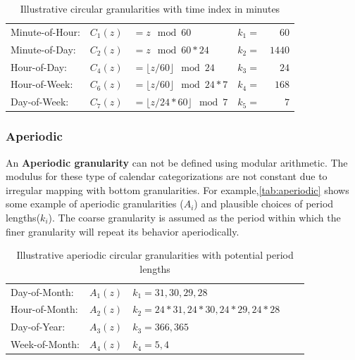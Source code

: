 \documentclass[12pt]{article}
\begin{document}
\begin{table}[ht]
\begin{center}
\begin{tabular}{lr@{~}lr@{~}r}
\toprule
Minute-of-Hour: & $C_1(z)$ & $= z \mod 60$ & $k_1 =$&$60$ \\
Minute-of-Day: & $C_2(z)$ & $= z \mod 60*24$ & $k_2=$&$1440$\\
Hour-of-Day: & $C_4(z)$ & $= \lfloor z/60\rfloor\mod 24$  & $k_3 =$&$24$ \\
Hour-of-Week: & $C_6(z)$ & $= \lfloor z/60\rfloor\mod 24*7$  & $k_4=$&$168$\\
Day-of-Week: & $C_7(z)$ & $= \lfloor z/24*60\rfloor \mod 7$ & $k_5=$&$7$\\
\bottomrule
\end{tabular}
\end{center}
\caption{Illustrative circular granularities with time index in minutes}
\label{tab:definitions}
\end{table}

\hypertarget{sec:aperiodic-gran-def}{%
\subsubsection{Aperiodic}\label{sec:aperiodic-gran-def}}

An \textbf{Aperiodic granularity} can not be defined using modular
arithmetic. The modulus for these type of calendar categorizations are
not constant due to irregular mapping with bottom granularities. For
example,\autoref{tab:aperiodic} shows some example of aperiodic
granularities (\(A_i\)) and plausible choices of period
lengths(\(k_i\)). The coarse granularity is assumed as the period within
which the finer granularity will repeat its behavior aperiodically.

\begin{table}[ht]
\begin{center}
\begin{tabular}{lr@{~}lr@{~}r}
\toprule

Day-of-Month: & $A_1(z)$ &  $k_1=31, 30, 29, 28$\\
Hour-of-Month: & $A_2(z)$ & $k_2=24*31, 24*30, 24*29, 24*28$\\
Day-of-Year: & $A_3(z)$ & $k_3=366, 365$\\
Week-of-Month: & $A_4(z)$ & $k_4=5, 4$\\ 
\bottomrule
\end{tabular}
\end{center}
\caption{Illustrative aperiodic circular granularities with potential period lengths}
\label{tab:aperiodic}
\end{table}
\end{document}
